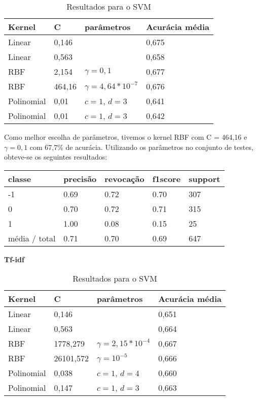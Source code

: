 \begin{table}[H]
	\centering
	\caption{Resultados para o SVM}
	\begin{tabular}{l l l l}
		\hline
		Kernel & C & parâmetros & Acurácia média \\
		\hline
		Linear & 0,146 & & 0,675 \\
		\hline
		Linear & 0,563 & & 0,658 \\
		\hline
		RBF & 2,154 & $\gamma = 0,1$ & 0,677 \\
		\hline
		RBF & 464,16 & $\gamma = 4,64*10^{-7}$ & 0,676 \\
		\hline
		Polinomial & 0,01 & $c = 1$, $d = 3$ & 0,641 \\
		\hline
		Polinomial & 0,01 & $c = 1$, $d = 3$ & 0,642 \\
		\hline
	\end{tabular}
\end{table}

Como melhor escolha de parâmetros, tivemos o kernel RBF com C = 464,16 e $\gamma = 0,1$ com
67,7\% de acurácia. Utilizando os parâmetros no conjunto de testes, obteve-se os seguintes
resultados:

\begin{table}[H]
	\centering
	\begin{tabular}{l | l | l | l | l}
		\hline
		classe  	&	precisão  &  revocação &  f1\-score &  support \\
		\hline
         -1   &    0.69  &    0.72   &   0.70   &    307 \\
         \hline
          0   &    0.70   &   0.72   &   0.71    &   315 \\
          \hline
          1   &    1.00   &   0.08   &   0.15    &    25 \\
		\hline
		média / total   &    0.71   &   0.70   &   0.69   &    647 \\
		\hline
	\end{tabular}
\end{table}

\textbf{Tf-idf}

\begin{table}[H]
	\centering
	\caption{Resultados para o SVM}
	\begin{tabular}{l l l l}
		\hline
		Kernel & C & parâmetros & Acurácia média \\
		\hline
		Linear & 0,146 & & 0,651 \\
		\hline
		Linear & 0,563 & & 0,664 \\
		\hline
		RBF & 1778,279 & $\gamma = 2,15*10^{-4}$ & 0,667 \\
		\hline
		RBF & 26101,572 & $\gamma = 10^{-5}$ & 0,666 \\
		\hline
		Polinomial & 0,038 & $c = 1$, $d = 4$ & 0,660 \\
		\hline
		Polinomial & 0,147 & $c = 1$, $d = 3$ & 0,663 \\
		\hline
	\end{tabular}
\end{table}

